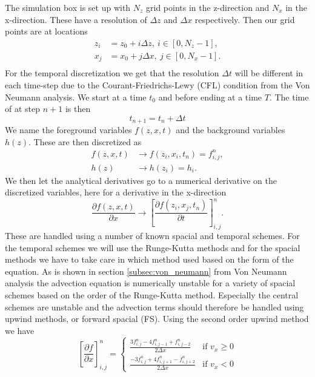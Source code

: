 The simulation box is set up with $N_z$ grid points in the z-direction and $N_x$ in the x-direction. These have a resolution of $\Delta z$ and $\Delta x$ respectively. Then our grid points are at locations
\begin{align*}
    z_i &= z_0 + i\Delta z,\ i\in[0,N_z-1], \\ 
    x_j &= x_0 + j\Delta x,\ j\in[0,N_x-1].\\ 
\end{align*}
For the temporal discretization we get that the resolution $\Delta t$ will be different in each time-step due to the Courant-Friedrichs-Lewy (CFL) condition from the Von Neumann analysis. We start at a time $t_0$ and before ending at a time $T$. The time of at step $n+1$ is then
\begin{equation*}
    t_{n+1} = t_n + \Delta t
\end{equation*}
We name the foreground variables $f(z,x,t)$ and the background variables $h(z)$. These are then discretized as
\begin{align*}
    f(z,x,t) &\rightarrow f(z_i, x_i, t_n) = f_{i,j}^n,\\
    h(z) &\rightarrow h(z_i) = h_i.
\end{align*}
We then let the analytical derivatives go to a numerical derivative on the discretized variables, here for a derivative in the x-direction
\begin{equation*}
    \frac{\partial f(z,x,t)}{\partial x}\rightarrow \left[\frac{\partial f(z_i,x_j,t_n)}{\partial t} \right]_{i,j}^n.
\end{equation*}
These are handled using a number of known spacial and temporal schemes. For the temporal schemes we will use the Runge-Kutta methods and for the spacial methods we have to take care in which method used based on the form of the equation. As is shown in section \ref{subsec:von_neumann} from Von Neumann analysis the advection equation is numerically unstable for a variety of spacial schemes based on the order of the Runge-Kutta method. Especially the central schemes are unstable and the advection terms should therefore be handled using upwind methods, or forward spacial (FS). Using the second order upwind method we have
\begin{equation}
    \left[\frac{\partial f}{\partial x} \right]_{i,j}^n= 
    \begin{cases} 
        \frac{3f_{i,j}^n-4f_{i,j-1}^n+f_{i,j-2}^n}{2\Delta x} & \text{if } v_x \geq 0 \\
        \frac{-3f_{i,j}^n+4f_{i,j+1}^n-f_{i,j+2}^n}{2\Delta x} & \text{if } v_x < 0 
    \end{cases}
\end{equation}
